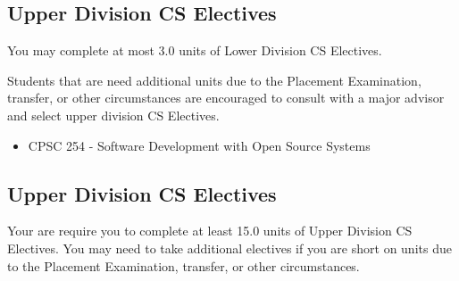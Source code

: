 \documentclass{book}
\begin{document}
\subsection{Upper Division CS Electives}
\label{section:lower_division_cs_electives}
You may complete at most 3.0 units of Lower Division CS Electives.

Students that are need additional units due to the Placement
Examination, transfer, or other circumstances are encouraged to
consult with a major advisor and select upper division CS Electives.
\begin{itemize}
\item CPSC 254 - Software Development with Open Source Systems
\end{itemize}

\subsection{Upper Division CS Electives}
\label{section:upper_division_cs_electives}

Your are require you to complete at least 15.0 units of Upper Division
CS Electives. You may need to take additional electives if you are
short on units due to the Placement Examination, transfer, or other
circumstances.
\end{document}
